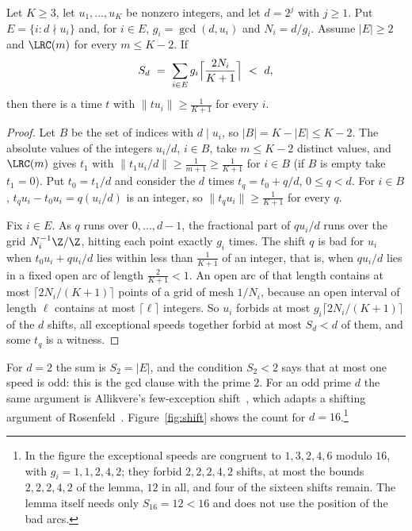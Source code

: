 \begin{lemma}\label{lem:shift}
Let $K\ge3$, let $u_1,\dots,u_K$ be nonzero integers, and let $d=2^j$ with
$j\ge1$. Put $E=\{i:d\nmid u_i\}$ and, for $i\in E$, $g_i=\gcd(d,u_i)$ and
$N_i=d/g_i$. Assume $|E|\ge2$ and $\LRC(m)$ for every $m\le K-2$. If
\begin{equation}\label{eq:Sd}
 S_d\ =\ \sum_{i\in E}g_i\Bigl\lceil\frac{2N_i}{K+1}\Bigr\rceil\ <\ d,
\end{equation}
then there is a time $t$ with $\|tu_i\|\ge\frac1{K+1}$ for every $i$.
\end{lemma}

\begin{proof}
Let $B$ be the set of indices with $d\mid u_i$, so $|B|=K-|E|\le K-2$. The
absolute values of the integers $u_i/d$, $i\in B$, take $m\le K-2$ distinct
values, and $\LRC(m)$ gives $t_1$ with $\|t_1u_i/d\|\ge\frac1{m+1}\ge
\frac1{K+1}$ for $i\in B$ (if $B$ is empty take $t_1=0$). Put $t_0=t_1/d$
and consider the $d$ times $t_q=t_0+q/d$, $0\le q<d$. For $i\in B$,
$t_qu_i-t_0u_i=q(u_i/d)$ is an integer, so $\|t_qu_i\|\ge\frac1{K+1}$ for
every $q$.

Fix $i\in E$. As $q$ runs over $0,\dots,d-1$, the fractional part of
$qu_i/d$ runs over the grid $N_i^{-1}\Z/\Z$, hitting each point exactly
$g_i$ times. The shift $q$ is bad for $u_i$ when $t_0u_i+qu_i/d$ lies within
less than $\frac1{K+1}$ of an integer, that is, when $qu_i/d$ lies in a
fixed open arc of length $\frac2{K+1}<1$. An open arc of that length
contains at most $\lceil2N_i/(K+1)\rceil$ points of a grid of mesh $1/N_i$,
because an open interval of length $\ell$ contains at most $\lceil\ell\rceil$
integers. So $u_i$ forbids at most $g_i\lceil2N_i/(K+1)\rceil$ of the $d$
shifts, all exceptional speeds together forbid at most $S_d<d$ of them, and
some $t_q$ is a witness.
\end{proof}

For $d=2$ the sum is $S_2=|E|$, and the condition $S_2<2$ says that at most
one speed is odd: this is the gcd clause with the prime $2$. For an odd
prime $d$ the same argument is Allikvere's few-exception
shift~\cite[Lemma~4.6]{All26}, which adapts a shifting argument of
Rosenfeld~\cite[Lemma~5]{Ros26b}. Figure~\ref{fig:shift} shows the count for
$d=16$.\footnote{In the figure the exceptional speeds are congruent to
$1,3,2,4,6$ modulo $16$, with $g_i=1,1,2,4,2$; they forbid $2,2,2,4,2$ shifts,
at most the bounds $2,2,2,4,2$ of the lemma, $12$ in all, and four of the
sixteen shifts remain. The lemma itself needs only $S_{16}=12<16$ and does
not use the position of the bad arcs.}

